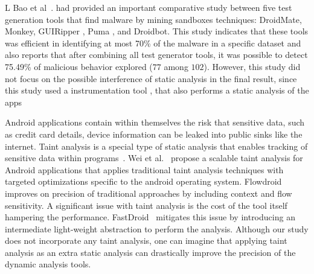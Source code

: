 


L Bao et al~.\cite{DBLP:conf/wcre/BaoLL18} had provided an important comparative study between five test generation tools that find malware by mining sandboxes techniques: DroidMate, Monkey, GUIRipper \cite{DBLP:conf/kbse/AmalfitanoFTCM12}, Puma \cite{DBLP:conf/mobisys/Hao0NHG14}, and Droidbot. This study indicates that these tools was efficient in identifying at most 70\% of the malware in a specific dataset and also reports that after combining all test generator tools, it was possible to detect 75.49\% of malicious behavior explored ($77$ among $102$). However, this study did not focus on the possible interference of static analysis in the final result, since this study used a instrumentation tool \cite{DBLP:conf/icsm/CaiR17a}, that also performs a static analysis of the apps 

Android applications contain within themselves the risk that sensitive data, such as credit card details, device information can be leaked into public sinks like the internet. Taint analysis is a special type of static analysis that enables tracking of sensitive data within programs~\cite{boddenesec}. Wei et al.~\cite{weiissta} propose a scalable taint analysis for Android applications that applies traditional taint analysis techniques with targeted optimizations specific to the android operating system. Flowdroid~\cite{arzt:pldi-2014} improves on precision of traditional approaches by including context and flow sensitivity. A significant issue with taint analysis is the cost of the tool itself hampering the performance. FastDroid~\cite{ZHANG2021102161} mitigates this issue by introducing an intermediate light-weight abstraction to perform the analysis. Although our study does not incorporate any taint analysis, one can imagine that applying taint analysis as an extra static analysis can drastically improve the precision of the dynamic analysis tools. 
